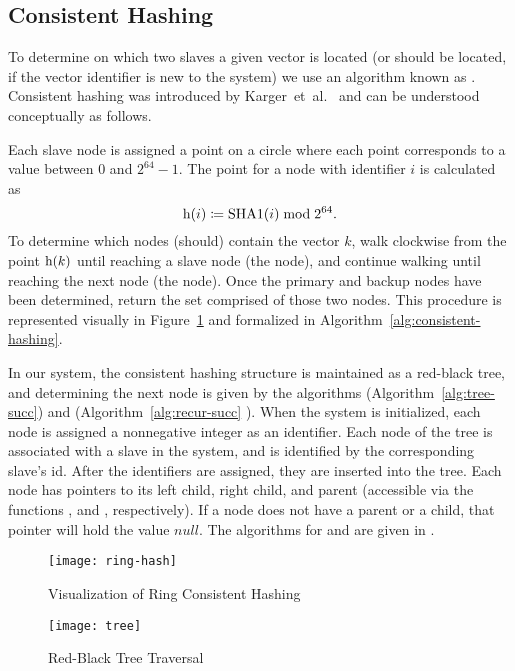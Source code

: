 \subsection{Consistent Hashing}
To determine on which two slaves a given vector is located (or should be
located, if the vector identifier is new to the system) we use an algorithm known as
. Consistent hashing was introduced by
Karger~et~al.~\cite{karger1997} and can be understood conceptually as follows.
\par
Each slave node is assigned a point on a circle where each point corresponds
to a value between \(0\) and \(2^{64} - 1\). The point for a node with
identifier \(i\) is calculated as
\begin{equation*}
    \mathrm{h}(i) \coloneqq \mathrm{SHA1}(i) \bmod{2^{64}}.
\end{equation*}
To determine which nodes (should) contain the vector \(k\), walk clockwise
from the point \(\mathrm{h}(k)\) until reaching a slave node (the
 node), and continue walking until reaching the next node
(the  node). Once the primary and backup nodes have been
determined, return the set comprised of those two nodes. This procedure is
represented visually in Figure~\ref{fig:ring-hash-process} and formalized in
Algorithm~\ref{alg:consistent-hashing}.
%
\par
In our system, the consistent hashing structure is maintained as a red-black
tree, and determining the next node is given by the algorithms
 (Algorithm~\ref{alg:tree-succ}) and
 (Algorithm~\ref{alg:recur-succ}
\cite{bstPredecessorSuccessor}). When the system is initialized, each node
is assigned a nonnegative integer as an identifier. Each node of the tree is
associated with a slave in the system, and is identified by the corresponding
slave's id. After the identifiers are assigned, they are inserted into the
tree. Each node has pointers to its left child, right child, and parent
(accessible via the functions ,  and
, respectively). If a node does not have a parent or a child,
that pointer will hold the value \(null\). The algorithms for
 and  are given in \cite{cormen2009}.
%
\begin{figure}
    \centering
    \texttt{[image: ring-hash]}
    \caption{Visualization of Ring Consistent Hashing}
    \label{fig:ring-hash-process}
\end{figure}
%
\begin{figure}
    \centering
    \texttt{[image: tree]}
    \caption{Red-Black Tree Traversal}
    \label{fig:tree-traversal}
\end{figure}
